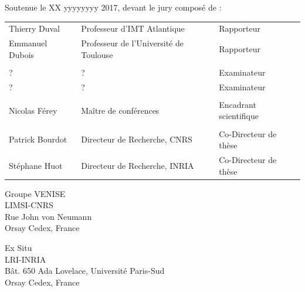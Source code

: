 \begin{titlepage}

Soutenue le XX yyyyyyyy 2017, devant le jury composé de :\\

\begin{center}
	\begin{tabular}{l l l}
	
	Thierry Duval		& Professeur d'IMT Atlantique				& Rapporteur	\\ 
	Emmanuel Dubois		& Professeur de l'Université de Toulouse	& Rapporteur	\\
						& 	&				\\ %
	?					&?		 		& Examinateur	\\ 
	?					&?				& Examinateur	\\ 
						& 	&				\\ %
	Nicolas Férey		& Maître de conférences					& Encadrant scientifique\\
						& 	&				\\ %
	Patrick Bourdot 	& Directeur de Recherche, CNRS	& Co-Directeur de thèse\\ 
	Stéphane Huot		& Directeur de Recherche, INRIA	& Co-Directeur de thèse\\ 
		
	\end{tabular}
\end{center}


\setlength{\columnsep}{7mm}
\setlength{\columnseprule}{0pt}

\begin{multicols}{2} 
\small 
\noindent Groupe VENISE					\\	
\noindent LIMSI-CNRS					\\
\noindent Rue John von Neumann			\\
 Orsay Cedex, France		\\	

\columnbreak

\raggedleft Ex Situ										\\
\noindent LRI-INRIA										\\
\noindent Bât. 650 Ada Lovelace, Université Paris-Sud	\\
 Orsay Cedex, France
\end{multicols}



\end{titlepage}